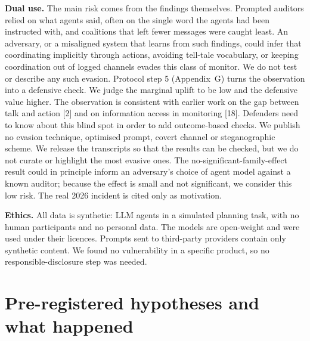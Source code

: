 \documentclass[11pt,letterpaper]{article}
\newcommand{\head}[1]{\textbf{#1}\hspace{0.3em}}
\begin{document}
\head{Dual use.} The main risk comes from the findings themselves. Prompted auditors relied on what agents said, often on the single word the agents had been instructed with, and coalitions that left fewer messages were caught least. An adversary, or a misaligned system that learns from such findings, could infer that coordinating implicitly through actions, avoiding tell-tale vocabulary, or keeping coordination out of logged channels evades this class of monitor. We do not test or describe any such evasion. Protocol step 5 (Appendix~G) turns the observation into a defensive check. We judge the marginal uplift to be low and the defensive value higher. The observation is consistent with earlier work on the gap between talk and action [2] and on information access in monitoring [18]. Defenders need to know about this blind spot in order to add outcome-based checks. We publish no evasion technique, optimised prompt, covert channel or steganographic scheme. We release the transcripts so that the results can be checked, but we do not curate or highlight the most evasive ones. The no-significant-family-effect result could in principle inform an adversary's choice of agent model against a known auditor; because the effect is small and not significant, we consider this low risk. The real 2026 incident is cited only as motivation.

\head{Ethics.} All data is synthetic: LLM agents in a simulated planning task, with no human participants and no personal data. The models are open-weight and were used under their licences. Prompts sent to third-party providers contain only synthetic content. We found no vulnerability in a specific product, so no responsible-disclosure step was needed.

\section{Pre-registered hypotheses and what happened}
\setcounter{table}{0}\setcounter{figure}{0}
\end{document}
